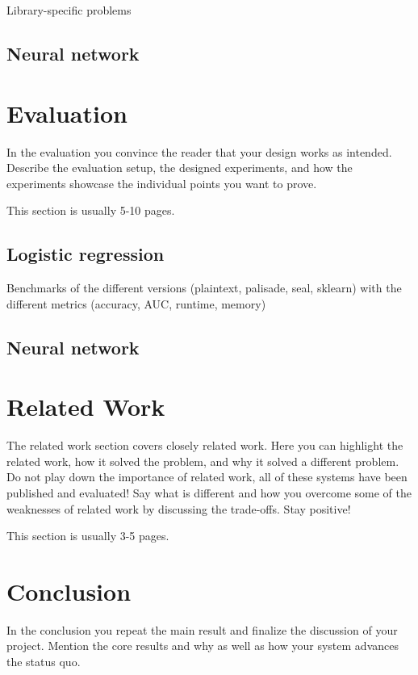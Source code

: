 \documentclass[a4paper,11pt,oneside]{report}
\begin{document}
Library-specific problems

\section{Neural network}



\chapter{Evaluation}

In the evaluation you convince the reader that your design works as intended.
Describe the evaluation setup, the designed experiments, and how the
experiments showcase the individual points you want to prove.

This section is usually 5-10 pages.

\section{Logistic regression}

Benchmarks of the different versions (plaintext, palisade, seal, sklearn) with the different metrics (accuracy, AUC, runtime, memory)

\section{Neural network}



\chapter{Related Work}

The related work section covers closely related work. Here you can highlight
the related work, how it solved the problem, and why it solved a different
problem. Do not play down the importance of related work, all of these
systems have been published and evaluated! Say what is different and how
you overcome some of the weaknesses of related work by discussing the 
trade-offs. Stay positive!

This section is usually 3-5 pages.


\chapter{Conclusion}

In the conclusion you repeat the main result and finalize the discussion of
your project. Mention the core results and why as well as how your system
advances the status quo.

\cleardoublepage
{}
{}
\printbibliography
\end{document}
